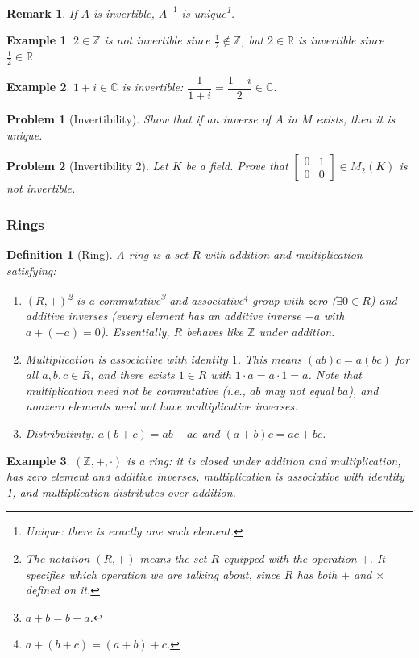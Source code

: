 \documentclass{article}
\newtheorem{definition}{Definition}
\newtheorem{problem}{Problem}
\newtheorem*{example}{Example}
\newtheorem{remark}{Remark}
\begin{document}
\begin{remark}
    If $A$ is invertible, $A^{-1}$ is unique\footnote{Unique: there is exactly one such element.}.
\end{remark}
\begin{example}
    $2 \in \mathbb{Z}$ is \emph{not} invertible since $\tfrac{1}{2} \notin \mathbb{Z}$, but $2 \in \mathbb{R}$ is invertible since $\tfrac{1}{2} \in \mathbb{R}$.
\end{example}
\begin{example}
    $1+i \in \mathbb{C}$ is invertible: $\dfrac{1}{1+i} = \dfrac{1-i}{2} \in \mathbb{C}$.
\end{example}
\begin{problem}[Invertibility]
    Show that if an inverse of $A$ in $M$ exists, then it is unique.
\end{problem}
\begin{problem}[Invertibility 2]
    Let $K$ be a field. Prove that $\begin{bmatrix}0&1\\0&0\end{bmatrix} \in M_2(K)$ is not invertible.
\end{problem}

\subsubsection{Rings}
\begin{definition}[Ring]
    \label{def:Ring}
    A ring is a set $R$ with addition and multiplication satisfying:
    \begin{enumerate}
        \item $(R,+)$\footnote{The notation $(R,+)$ means the set $R$ equipped with the operation $+$. It specifies which operation we are talking about, since $R$ has both $+$ and $\times$ defined on it.} is a commutative\footnote{$a+b=b+a$.} and associative\footnote{$a+(b+c)=(a+b)+c$.} group with zero ($\exists0\in R$) and additive inverses (every element has an additive inverse $-a$ with $a+(-a)=0$). Essentially, $R$ behaves like $\mathbb{Z}$ under addition.
        \item Multiplication is associative with identity $1$. This means $(ab)c = a(bc)$ for all $a,b,c\in R$, and there exists $1\in R$ with $1\cdot a = a\cdot 1 = a$. Note that multiplication need \emph{not} be commutative (i.e., $ab$ may not equal $ba$), and nonzero elements need not have multiplicative inverses.
        \item Distributivity: $a(b+c)=ab+ac$ and $(a+b)c=ac+bc$.
    \end{enumerate}
\end{definition}
\begin{example}
    $(\mathbb{Z},+,\cdot)$ is a ring: it is closed under addition and multiplication, has zero element and additive inverses, multiplication is associative with identity 1, and multiplication distributes over addition.
\end{example}
\end{document}
